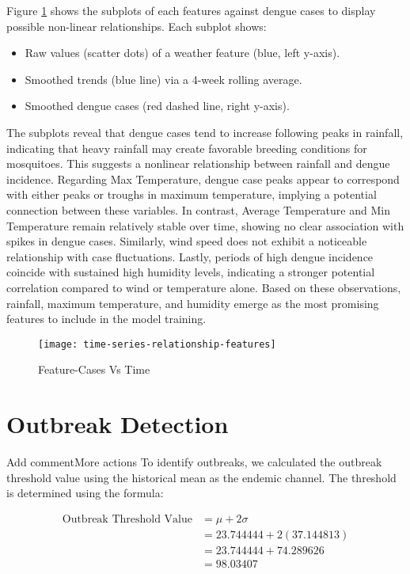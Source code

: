Figure \ref{fig:time-series-relationship} shows the subplots of each features against dengue cases to display possible non-linear relationships. Each subplot shows: 
\begin{itemize}
	\item Raw values (scatter dots) of a weather feature (blue, left y-axis).
	\item Smoothed trends (blue line) via a 4-week rolling average.
	\item Smoothed dengue cases (red dashed line, right y-axis).
\end{itemize}

The subplots reveal that dengue cases tend to increase following peaks in rainfall, indicating that heavy rainfall may create favorable breeding conditions for mosquitoes. This suggests a nonlinear relationship between rainfall and dengue incidence. Regarding Max Temperature, dengue case peaks appear to correspond with either peaks or troughs in maximum temperature, implying a potential connection between these variables. In contrast, Average Temperature and Min Temperature remain relatively stable over time, showing no clear association with spikes in dengue cases. Similarly, wind speed does not exhibit a noticeable relationship with case fluctuations. Lastly, periods of high dengue incidence coincide with sustained high humidity levels, indicating a stronger potential correlation compared to wind or temperature alone. Based on these observations, rainfall, maximum temperature, and humidity emerge as the most promising features to include in the model training.

\begin{figure}[p]
	\centering
	\texttt{[image: time-series-relationship-features]}
	\caption{Feature-Cases Vs Time}
	\label{fig:time-series-relationship}
\end{figure}

\clearpage

\section{Outbreak Detection}  Add commentMore actions
To identify outbreaks, we calculated the outbreak threshold value using the historical mean as the endemic channel. The threshold is determined using the formula:  

\begin{align}  
	\text{Outbreak Threshold Value} &= \mu + 2\sigma \\  
	&= 23.744444 + 2(37.144813) \\  
	&= 23.744444 + 74.289626 \\  
	&= 98.03407  
\end{align}  

